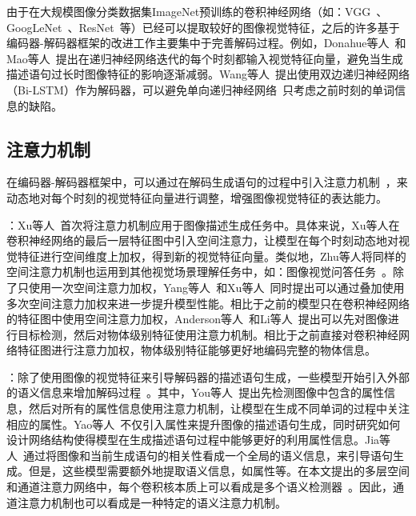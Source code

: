 由于在大规模图像分类数据集ImageNet预训练的卷积神经网络（如：VGG~\cite{simonyan2015very}、GoogLeNet~\cite{szegedy2015going}、ResNet~\cite{he2016deep}等）已经可以提取较好的图像视觉特征，之后的许多基于编码器-解码器框架的改进工作主要集中于完善解码过程。例如，Donahue等人~\cite{donahue2015long}和Mao等人~\cite{mao2015deep}提出在递归神经网络迭代的每个时刻都输入视觉特征向量，避免当生成描述语句过长时图像特征的影响逐渐减弱。Wang等人~\cite{wang2016image}提出使用双边递归神经网络（Bi-LSTM）作为解码器，可以避免单向递归神经网络~\cite{hochreiter1997long}只考虑之前时刻的单词信息的缺陷。

\subsection{注意力机制}

在编码器-解码器框架中，可以通过在解码生成语句的过程中引入注意力机制~\cite{bahdanau2014neural}，来动态地对每个时刻的视觉特征向量进行调整，增强图像视觉特征的表达能力。

\textbf{}：Xu等人~\cite{xu2015show}首次将注意力机制应用于图像描述生成任务中。具体来说，Xu等人在卷积神经网络的最后一层特征图中引入空间注意力，让模型在每个时刻动态地对视觉特征进行空间维度上加权，得到新的视觉特征向量。类似地，Zhu等人将同样的空间注意力机制也运用到其他视觉场景理解任务中，如：图像视觉问答任务~\cite{zhu2016visual7w}。除了只使用一次空间注意力加权，Yang等人~\cite{yang2016stacked}和Xu等人~\cite{xu2016ask}同时提出可以通过叠加使用多次空间注意力加权来进一步提升模型性能。相比于之前的模型只在卷积神经网络的特征图中使用空间注意力加权，Anderson等人~\cite{anderson2018bottom}和Li等人~\cite{li2016visual}提出可以先对图像进行目标检测，然后对物体级别特征使用注意力机制。相比于之前直接对卷积神经网络特征图进行注意力加权，物体级别特征能够更好地编码完整的物体信息。

\textbf{}：除了使用图像的视觉特征来引导解码器的描述语句生成，一些模型开始引入外部的语义信息来增加解码过程~\cite{wu2016what,you2016image,pan2017video,yao2017boosting}。其中，You等人~\cite{you2016image}提出先检测图像中包含的属性信息，然后对所有的属性信息使用注意力机制，让模型在生成不同单词的过程中关注相应的属性。Yao等人~\cite{yao2017boosting}不仅引入属性来提升图像的描述语句生成，同时研究如何设计网络结构使得模型在生成描述语句过程中能够更好的利用属性信息。Jia等人~\cite{jia2015guiding}通过将图像和当前生成语句的相关性看成一个全局的语义信息，来引导语句生成。但是，这些模型需要额外地提取语义信息，如属性等。在本文提出的多层空间和通道注意力网络中，每个卷积核本质上可以看成是多个语义检测器~\cite{zeiler2014visualizing}。因此，通道注意力机制也可以看成是一种特定的语义注意力机制。



